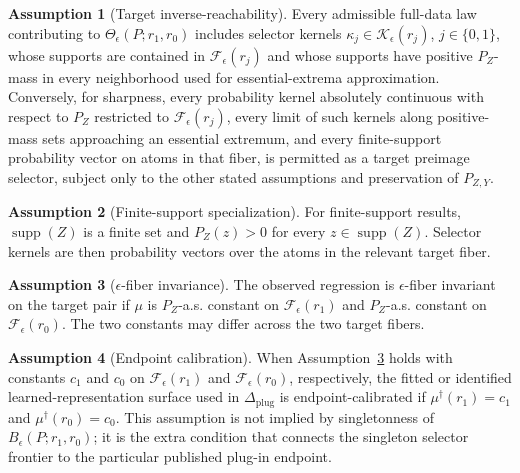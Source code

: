 \documentclass[11pt]{article}
\theoremstyle{definition}
\newtheorem{assumption}{Assumption}
\theoremstyle{plain}
\theoremstyle{remark}
\begin{document}
\begin{assumption}[Target inverse-reachability]\label{ass:target-reachability}
Every admissible full-data law contributing to \(\Theta_\epsilon(P;r_1,r_0)\) includes selector kernels \(\kappa_j\in\mathcal K_\epsilon(r_j)\), \(j\in\{0,1\}\), whose supports are contained in \(\mathcal F_\epsilon(r_j)\) and whose supports have positive \(P_Z\)-mass in every neighborhood used for essential-extrema approximation.  Conversely, for sharpness, every probability kernel absolutely continuous with respect to \(P_Z\) restricted to \(\mathcal F_\epsilon(r_j)\), every limit of such kernels along positive-mass sets approaching an essential extremum, and every finite-support probability vector on atoms in that fiber, is permitted as a target preimage selector, subject only to the other stated assumptions and preservation of \(P_{Z,Y}\).
\end{assumption}

\begin{assumption}[Finite-support specialization]\label{ass:finite-support}
For finite-support results, \(\operatorname{supp}(Z)\) is a finite set and \(P_Z(z)>0\) for every \(z\in\operatorname{supp}(Z)\).  Selector kernels are then probability vectors over the atoms in the relevant target fiber.
\end{assumption}

\begin{assumption}[\(\epsilon\)-fiber invariance]\label{ass:fiber-invariance}
The observed regression is \(\epsilon\)-fiber invariant on the target pair if \(\mu\) is \(P_Z\)-a.s. constant on \(\mathcal F_\epsilon(r_1)\) and \(P_Z\)-a.s. constant on \(\mathcal F_\epsilon(r_0)\).  The two constants may differ across the two target fibers.
\end{assumption}

\begin{assumption}[Endpoint calibration]\label{ass:endpoint-calibration}
When Assumption~\ref{ass:fiber-invariance} holds with constants \(c_1\) and \(c_0\) on \(\mathcal F_\epsilon(r_1)\) and \(\mathcal F_\epsilon(r_0)\), respectively, the fitted or identified learned-representation surface used in \(\Delta_{\mathrm{plug}}\) is endpoint-calibrated if \(\mu^\dagger(r_1)=c_1\) and \(\mu^\dagger(r_0)=c_0\).  This assumption is not implied by singletonness of \(B_\epsilon(P;r_1,r_0)\); it is the extra condition that connects the singleton selector frontier to the particular published plug-in endpoint.
\end{assumption}
\end{document}
